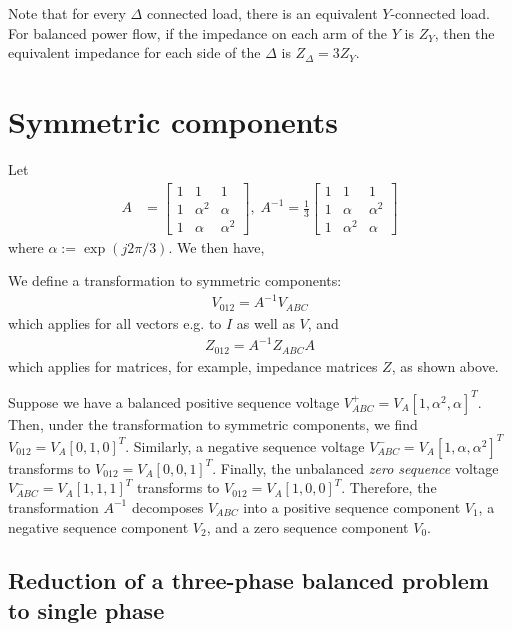 \documentclass[11pt]{article}
\begin{document}
Note that for every $\Delta$ connected load, there is an equivalent $Y$-connected load. For balanced power flow, if the impedance on each arm of the $Y$ is $Z_Y$, then the equivalent impedance for each side of the $\Delta$ is $Z_\Delta = 3Z_Y$.

\section{Symmetric components}
Let 
\begin{align}
	A &= \left[
		\begin{array}{lll}
			1 & 1 & 1 \\
			1 & \alpha^2 & \alpha \\
			1 & \alpha & \alpha^2
		\end{array}
	\right],\;
	A^{-1} = \frac{1}{3}\left[
		\begin{array}{lll}
			1 & 1 & 1 \\
			1 & \alpha & \alpha^2 \\
			1 & \alpha^2 & \alpha
		\end{array}
	\right]
\end{align}
where $\alpha := \exp(j2\pi/3)$. We then have,

We define a transformation to symmetric components:
\begin{align}
	V_{012} = A^{-1}V_{ABC}
\end{align}
which applies for all vectors e.g. to $I$ as well as $V$, and
\begin{align}
	Z_{012} = A^{-1}Z_{ABC}A
\end{align}
which applies for matrices, for example, impedance matrices $Z$, as shown above.

Suppose we have a balanced positive sequence voltage $V^+_{ABC} = V_A[1, \alpha^2, \alpha]^T$. Then, under the transformation to symmetric components, we find $V_{012} = V_A[0, 1, 0]^T$. Similarly, a negative sequence voltage $V^-_{ABC} = V_A[1, \alpha, \alpha^2]^T$ transforms to $V_{012} = V_A[0, 0, 1]^T$. Finally, the unbalanced \emph{zero sequence} voltage $V^-_{ABC} = V_A[1, 1, 1]^T$ transforms to $V_{012} = V_A[1, 0, 0]^T$. Therefore, the transformation $A^{-1}$ decomposes $V_{ABC}$ into a positive sequence component $V_1$, a negative sequence component $V_2$, and a zero sequence component $V_0$.

\subsection{Reduction of a three-phase balanced problem to single phase}
\end{document}
